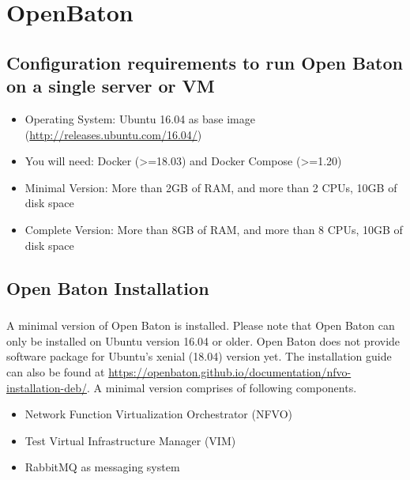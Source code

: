 \chapter{OpenBaton}
\label{ch:ob}

	\section{Configuration requirements to run Open Baton on a single server or VM}
	\label{sec:Configuration requirements to run Open Baton on a single server or VM}
	\begin{itemize}
		\item Operating System: Ubuntu 16.04 as base image (\hyperlink{name}{http://releases.ubuntu.com/16.04/})
		\item You will need: Docker (>=18.03) and Docker Compose (>=1.20)
		\item Minimal Version: More than 2GB of RAM, and more than 2 CPUs, 10GB of disk space
		\item Complete Version: More than 8GB of RAM, and more than 8 CPUs, 10GB of disk space
	\end{itemize}

	\section{Open Baton Installation}
	\label{Open Baton Installation}
		\paragraph{}
		A minimal version of Open Baton is installed. Please note that Open Baton can only be installed on Ubuntu version 16.04 or older. Open Baton does not provide software package for Ubuntu’s xenial (18.04) version yet. The installation guide can also be found at \hyperlink{name}{https://openbaton.github.io/documentation/nfvo-installation-deb/}. A minimal version comprises of following components.
		\begin{itemize}
			\item Network Function Virtualization Orchestrator (NFVO)
			\item Test Virtual Infrastructure Manager (VIM)
			\item RabbitMQ as messaging system
		\end{itemize}
